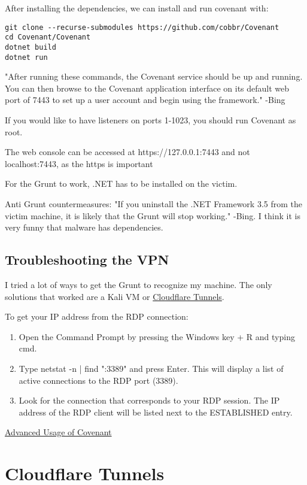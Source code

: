 \documentclass{article}
\begin{document}
After installing the dependencies, we can install and run covenant with:

\begin{lstlisting}
git clone --recurse-submodules https://github.com/cobbr/Covenant
cd Covenant/Covenant
dotnet build
dotnet run
\end{lstlisting}

"After running these commands, the Covenant service should be up and running. 
You can then browse to the Covenant application interface on its default web port of 
7443 to set up a user account and begin using the framework." -Bing

If you would like to have listeners on ports 1-1023, you should run Covenant as root.

The web console can be accessed at https://127.0.0.1:7443 and not localhost:7443, as the https is important

For the Grunt to work, .NET has to be installed on the victim.

Anti Grunt countermeasures:
"If you uninstall the .NET Framework 3.5 from the victim machine, 
it is likely that the Grunt will stop working." -Bing.
I think it is very funny that malware has dependencies.

\subsection{Troubleshooting the VPN}
I tried a lot of ways to get the Grunt to recognize my machine.
The only solutions that worked are a Kali VM or \href{sec:CloudflareTunnels}{Cloudflare Tunnels}.

To get your IP address from the RDP connection:
\begin{enumerate}
\item Open the Command Prompt by pressing the Windows key + R and typing cmd.
\item Type netstat -n | find ":3389" and press Enter. This will display a list of active connections to the RDP port (3389).
\item Look for the connection that corresponds to your RDP session. The IP address of the RDP client will be listed next to the ESTABLISHED entry.
\end{enumerate}

\href{https://youtu.be/Fi0jXm8VOFU}{Advanced Usage of Covenant}

\section{Cloudflare Tunnels}
\label{sec:CloudflareTunnels}
\end{document}
